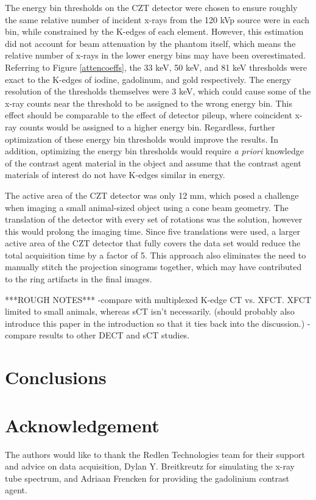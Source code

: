 \documentclass[journal, a4paper]{IEEEtran}
\begin{document}
The energy bin thresholds on the CZT detector were chosen to ensure roughly the same relative number of incident x-rays from the 120 kVp source were in each bin, while constrained by the K-edges of each element. However, this estimation did not account for beam attenuation by the phantom itself, which means the relative number of x-rays in the lower energy bins may have been overestimated. Referring to Figure \ref{attencoeffs}, the 33 keV, 50 keV, and 81 keV thresholds were exact to the K-edges of iodine, gadolinum, and gold respectively. The energy resolution of the thresholds themselves were 3 keV, which could cause some of the x-ray counts near the threshold to be assigned to the wrong energy bin. This effect should be comparable to the effect of detector pileup, where coincident x-ray counts would be assigned to a higher energy bin. Regardless, further optimization of these energy bin thresholds would improve the results. In addition, optimizing the energy bin thresholds would require \textit{a priori} knowledge of the contrast agent material in the object and assume that the contrast agent materials of interest do not have K-edges similar in energy.

The active area of the CZT detector was only 12 mm, which posed a challenge when imaging a small animal-sized object using a cone beam geometry. The translation of the detector with every set of rotations was the solution, however this would prolong the imaging time. Since five translations were used, a larger active area of the CZT detector that fully covers the data set would reduce the total acquisition time by a factor of 5. This approach also eliminates the need to manually stitch the projection sinograms together, which may have contributed to the ring artifacts in the final images.

***ROUGH NOTES***
-compare with multiplexed K-edge CT vs. XFCT\cite{kedge}. XFCT limited to small animals, whereas sCT isn't necessarily. (should probably also introduce this paper in the introduction so that it ties back into the discussion.)
-compare results to other DECT and sCT studies.
\section{Conclusions}

\section{Acknowledgement}
The authors would like to thank the Redlen Technologies team for their support and advice on data acquisition, Dylan Y. Breitkreutz for simulating the x-ray tube spectrum, and Adriaan Frencken for providing the gadolinium contrast agent.



    
\end{document}
